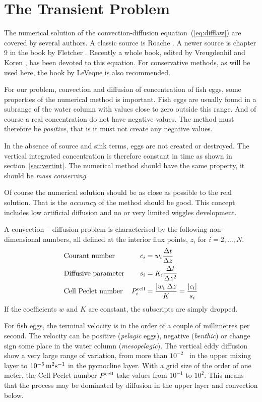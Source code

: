 \section{The Transient Problem}\label{sec:numtrans}

The numerical solution of the convection-diffusion
equation~(\ref{eq:difflaw}) are covered by several authors.  A classic
source is Roache . A newer source is chapter 9 in
the book by Fletcher . Recently a whole book, edited
by Vreugdenhil and Koren , has been devoted to this
equation.  For conservative methods, as will be used here, the book by
LeVeque  is also recommended.

For our problem, convection and diffusion of concentration of fish
eggs, some properties of the numerical method is important.  Fish eggs
are usually found in a subrange of the water column with values close
to zero outside this range. And of course a real concentration do not
have negative values.  The method must therefore be
\emph{positive}, that is it must not create
any negative values.

In the absence of source and sink terms, eggs are not created or
destroyed. The vertical integrated concentration is therefore constant
in time as shown in section~\ref{sec:vertint}.  The numerical method
should have the same property, it should be \emph{mass
conserving}. 

Of course the numerical solution should be as close as possible to the
real solution. That is the \emph{accuracy} of the method should be
good. This concept includes low artificial diffusion and no or very
limited wiggles development.

A convection -- diffusion problem is characterised by the following
non-dimensional numbers, all defined at the interior flux points,
$z_i$ for $i = 2, \dots, N$.
\begin{align}
  & \text{Courant number}         & c_i & = w_i\frac{\Delta t}{\Delta z} \\
  & \text{Diffusive parameter}    & s_i & = K_i \frac{\Delta t}{\Delta z^2} \\
  & \text{Cell Peclet number}     & P^{\mathrm{cell}}_i & = 
       \frac{|w_i| \Delta z}{K} = \frac{|c_i|}{s_i}
\end{align}
If the coefficients $w$ and $K$
are constant, the subscripts are simply dropped.

For fish eggs, the terminal velocity is in the order of a couple of
millimetres per second. The velocity can be positive (\emph{pelagic}
eggs), negative (\emph{benthic}) or change sign some place in the water column
(\emph{mesopelagic}). The vertical eddy
diffusion show a very large range of variation, from more than
$10^{-2}$ \sqmps\ in the upper mixing layer to $10^{-5} \, \mbox{m}^2 \mbox{s}^{-1}$
in the pycnocline layer.  With a grid size of the
order of one meter, the Cell Peclet number $P^{\mathrm{cell}}$ take values from
$10^{-1}$ to $10^2$. This means that the process may be dominated by
diffusion in the upper layer and convection below.

